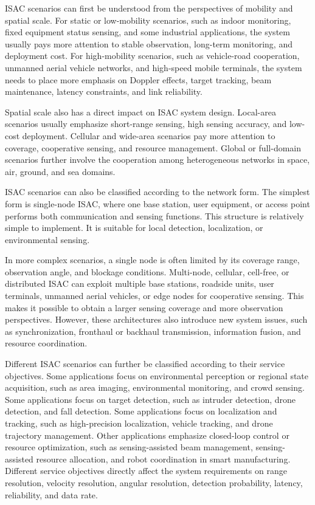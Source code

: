 
ISAC scenarios can first be understood from the perspectives of mobility and spatial scale.
For static or low-mobility scenarios, such as indoor monitoring, fixed equipment status sensing, and some industrial applications, the system usually pays more attention to stable observation, long-term monitoring, and deployment cost.
For high-mobility scenarios, such as vehicle-road cooperation, unmanned aerial vehicle networks, and high-speed mobile terminals, the system needs to place more emphasis on Doppler effects, target tracking, beam maintenance, latency constraints, and link reliability.

Spatial scale also has a direct impact on ISAC system design.
Local-area scenarios usually emphasize short-range sensing, high sensing accuracy, and low-cost deployment.
Cellular and wide-area scenarios pay more attention to coverage, cooperative sensing, and resource management.
Global or full-domain scenarios further involve the cooperation among heterogeneous networks in space, air, ground, and sea domains.


ISAC scenarios can also be classified according to the network form.
The simplest form is single-node ISAC, where one base station, user equipment, or access point performs both communication and sensing functions.
This structure is relatively simple to implement.
It is suitable for local detection, localization, or environmental sensing.

In more complex scenarios, a single node is often limited by its coverage range, observation angle, and blockage conditions.
Multi-node, cellular, cell-free, or distributed ISAC can exploit multiple base stations, roadside units, user terminals, unmanned aerial vehicles, or edge nodes for cooperative sensing.
This makes it possible to obtain a larger sensing coverage and more observation perspectives.
However, these architectures also introduce new system issues, such as synchronization, fronthaul or backhaul transmission, information fusion, and resource coordination.


Different ISAC scenarios can further be classified according to their service objectives.
Some applications focus on environmental perception or regional state acquisition, such as area imaging, environmental monitoring, and crowd sensing.
Some applications focus on target detection, such as intruder detection, drone detection, and fall detection.
Some applications focus on localization and tracking, such as high-precision localization, vehicle tracking, and drone trajectory management.
Other applications emphasize closed-loop control or resource optimization, such as sensing-assisted beam management, sensing-assisted resource allocation, and robot coordination in smart manufacturing.
Different service objectives directly affect the system requirements on range resolution, velocity resolution, angular resolution, detection probability, latency, reliability, and data rate.

